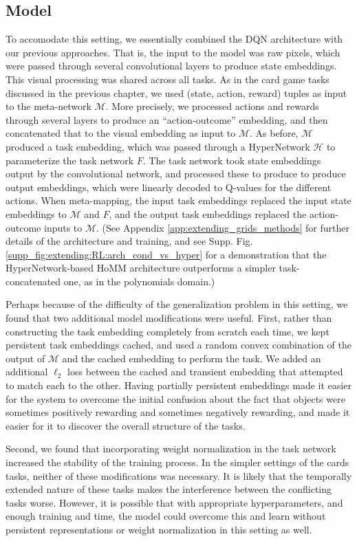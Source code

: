 \subsection{Model}
To accomodate this setting, we essentially combined the DQN architecture \citep{Mnih2015} with our previous approaches. That is, the input to the model was raw pixels, which were passed through several convolutional layers to produce state embeddings. This visual processing was shared across all tasks. As in the card game tasks discussed in the previous chapter, we used (state, action, reward) tuples as input to the meta-network \(\mathcal{M}\). More precisely, we processed actions and rewards through several layers to produce an ``action-outcome'' embedding, and then concatenated that to the visual embedding as input to \(\mathcal{M}\). As before, \(\mathcal{M}\) produced a task embedding, which was passed through a HyperNetwork \(\mathcal{H}\) to parameterize the task network \(F\). The task network took state embeddings output by the convolutional network, and processed these to produce to produce output embeddings, which were linearly decoded to Q-values for the different actions. When meta-mapping, the input task embeddings replaced the input state embeddings to \(\mathcal{M}\) and \(F\), and the output task embeddings replaced the action-outcome inputs to \(\mathcal{M}\). (See Appendix \ref{app:extending_grids_methods} for further details of the architecture and training, and see Supp. Fig. \ref{supp_fig:extending:RL:arch_cond_vs_hyper} for a demonstration that the HyperNetwork-based HoMM architecture outperforms a simpler task-concatenated one, as in the polynomials domain.)\par 
Perhaps because of the difficulty of the generalization problem in this setting, we found that two additional model modifications were useful. First, rather than constructing the task embedding completely from scratch each time, we kept persistent task embeddings cached, and used a random convex combination of the output of \(\mathcal{M}\) and the cached embedding to perform the task. We added an additional \(\ell_2\) loss between the cached and transient embedding that attempted to match each to the other. Having partially persistent embeddings made it easier for the system to overcome the initial confusion about the fact that objects were sometimes positively rewarding and sometimes negatively rewarding, and made it easier for it to discover the overall structure of the tasks. \par
Second, we found that incorporating weight normalization \citep{Salimans2016} in the task network increased the stability of the training process. In the simpler settings of the cards tasks, neither of these modifications was necessary. It is likely that the temporally extended nature of these tasks makes the interference between the conflicting tasks worse. However, it is possible that with appropriate hyperparameters, and enough training and time, the model could overcome this and learn without persistent representations or weight normalization in this setting as well. \par 

